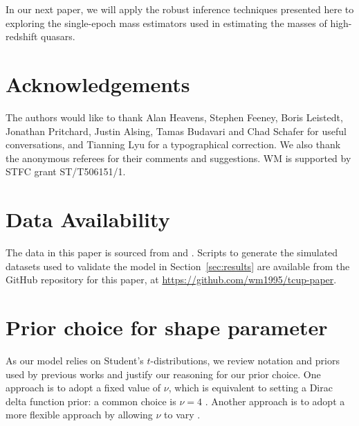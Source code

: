\documentclass[fleqn,usenatbib]{rasti}
\begin{document}
In our next paper, we will apply the robust inference techniques presented here
to exploring the single-epoch mass estimators used in estimating the masses of
high-redshift quasars.

\section*{Acknowledgements}

The authors would like to thank Alan Heavens, Stephen Feeney, Boris Leistedt,
Jonathan Pritchard, Justin Alsing, Tamas Budavari and Chad Schafer for useful
conversations, and Tianning Lyu for a typographical correction. We also thank
the anonymous referees for their comments and suggestions. WM is supported by
STFC grant ST/T506151/1.

\section*{Data Availability}

The data in this paper is sourced from \citet{Kelly:2007} and \citet{Park:2017}.
Scripts to generate the simulated datasets used to validate the model in
Section~\ref{sec:results} are available from the GitHub repository for this
paper, at \url{https://github.com/wm1995/tcup-paper}.







\appendix

\section{Prior choice for shape parameter}
\label{sec:t-prior}

As our model relies on Student's $t$-distributions, we review notation and
priors used by previous works and justify our reasoning for our prior choice.
One approach is to adopt a fixed value of $\nu$, which is equivalent to setting
a Dirac delta function prior: a common choice is $\nu = 4$
\citep[e.g.][]{Berger:1994, Gelman:2013}.  Another approach is to adopt a more
flexible approach by allowing $\nu$ to vary \citep[e.g.][]{Juarez:2010,
Gelman:2013, Ding:2014, Park:2017, Feeney:2018}.
\end{document}
